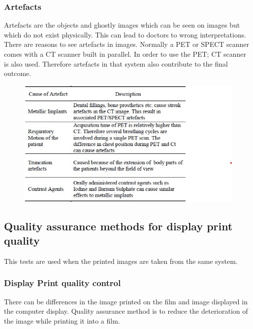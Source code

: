 \documentclass[12pt]{article}
\begin{document}
\subsubsection{Artefacts}
Artefacts are the objects and ghostly images which can be seen on images but which do not exist physically. This can lead to doctors to wrong interpretations. There are reasons to see artefacts in images. Normally a PET or SPECT scanner comes with a CT scanner built in parallel. In order to use the PET; CT scanner is also used. Therefore artefacts in that system also contribute to the final outcome. 
\begin{figure}[h!]
    \centering
    \includegraphics[width=0.85\linewidth]{ar.jpg}
\end{figure}


\subsection{Quality assurance methods for display print quality}
This tests are used when the printed images are taken from the same system.


\subsubsection{Display Print quality control}
There can be differences in the image printed on the film and image displayed in the computer display. Quality assurance method is to reduce the deterioration of the image while printing it into a film. 
\end{document}
